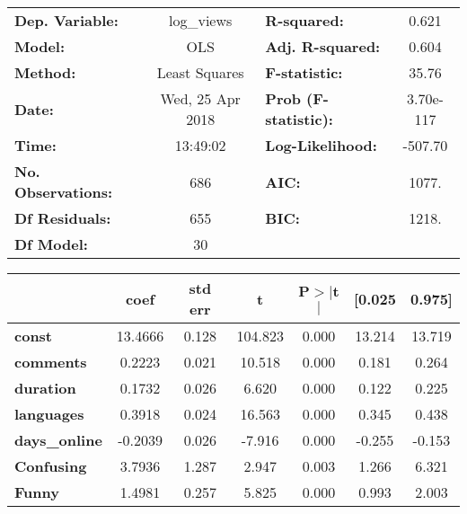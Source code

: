 \documentclass{report}
\begin{document}
\begin{center}
\begin{tabular}{lclc}
\toprule
\textbf{Dep. Variable:}    &    log_views     & \textbf{  R-squared:         } &     0.621   \\
\textbf{Model:}            &       OLS        & \textbf{  Adj. R-squared:    } &     0.604   \\
\textbf{Method:}           &  Least Squares   & \textbf{  F-statistic:       } &     35.76   \\
\textbf{Date:}             & Wed, 25 Apr 2018 & \textbf{  Prob (F-statistic):} & 3.70e-117   \\
\textbf{Time:}             &     13:49:02     & \textbf{  Log-Likelihood:    } &   -507.70   \\
\textbf{No. Observations:} &         686      & \textbf{  AIC:               } &     1077.   \\
\textbf{Df Residuals:}     &         655      & \textbf{  BIC:               } &     1218.   \\
\textbf{Df Model:}         &          30      & \textbf{                     } &             \\
\bottomrule
\end{tabular}
\begin{tabular}{lcccccc}
                       & \textbf{coef} & \textbf{std err} & \textbf{t} & \textbf{P$>$$|$t$|$} & \textbf{[0.025} & \textbf{0.975]}  \\
\midrule
\textbf{const}         &      13.4666  &        0.128     &   104.823  &         0.000        &       13.214    &       13.719     \\
\textbf{comments}      &       0.2223  &        0.021     &    10.518  &         0.000        &        0.181    &        0.264     \\
\textbf{duration}      &       0.1732  &        0.026     &     6.620  &         0.000        &        0.122    &        0.225     \\
\textbf{languages}     &       0.3918  &        0.024     &    16.563  &         0.000        &        0.345    &        0.438     \\
\textbf{days\_online}  &      -0.2039  &        0.026     &    -7.916  &         0.000        &       -0.255    &       -0.153     \\
\textbf{Confusing}     &       3.7936  &        1.287     &     2.947  &         0.003        &        1.266    &        6.321     \\
\textbf{Funny}         &       1.4981  &        0.257     &     5.825  &         0.000        &        0.993    &        2.003     \\

\end{tabular}
\end{center}
\end{document}
